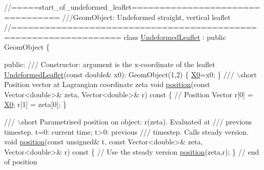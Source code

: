 \begin{DoxyCodeInclude}
\textcolor{comment}{//=====start\_of\_undeformed\_leaflet=================================}
\textcolor{comment}{///GeomObject: Undeformed straight, vertical leaflet}
\textcolor{comment}{}\textcolor{comment}{//=================================================================}
\textcolor{keyword}{class }\hyperlink{classUndeformedLeaflet}{UndeformedLeaflet} : \textcolor{keyword}{public} GeomObject
\{

\textcolor{keyword}{public}:
\textcolor{comment}{}
\textcolor{comment}{ /// Constructor: argument is the x-coordinate of the leaflet}
\textcolor{comment}{} \hyperlink{classUndeformedLeaflet_ac4c0478b1f329360684af14b59043b12}{UndeformedLeaflet}(\textcolor{keyword}{const} \textcolor{keywordtype}{double}& x0): GeomObject(1,2)
  \{
   \hyperlink{classUndeformedLeaflet_aa89fc695af9e53aa38894c9d875afd36}{X0}=x0;
  \}
 \textcolor{comment}{}
\textcolor{comment}{ /// \(\backslash\)short Position vector at Lagrangian coordinate zeta }
\textcolor{comment}{} \textcolor{keywordtype}{void} \hyperlink{classUndeformedLeaflet_a8e9b79702eb9a38e19886b84aeb47918}{position}(\textcolor{keyword}{const} Vector<double>& zeta, Vector<double>& r)\textcolor{keyword}{ const}
\textcolor{keyword}{  }\{
   \textcolor{comment}{// Position Vector}
   r[0] = \hyperlink{classUndeformedLeaflet_aa89fc695af9e53aa38894c9d875afd36}{X0};
   r[1] = zeta[0];
  \}

\textcolor{comment}{}
\textcolor{comment}{ /// \(\backslash\)short Parametrised position on object: r(zeta). Evaluated at}
\textcolor{comment}{ /// previous timestep. t=0: current time; t>0: previous}
\textcolor{comment}{ /// timestep. Calls steady version.}
\textcolor{comment}{} \textcolor{keywordtype}{void} \hyperlink{classUndeformedLeaflet_a8e9b79702eb9a38e19886b84aeb47918}{position}(\textcolor{keyword}{const} \textcolor{keywordtype}{unsigned}& t, \textcolor{keyword}{const} Vector<double>& zeta,
               Vector<double>& r)\textcolor{keyword}{ const}
\textcolor{keyword}{  }\{
   \textcolor{comment}{// Use the steady version}
   \hyperlink{classUndeformedLeaflet_a8e9b79702eb9a38e19886b84aeb47918}{position}(zeta,r);
  \} \textcolor{comment}{// end of position}


\end{DoxyCodeInclude}
